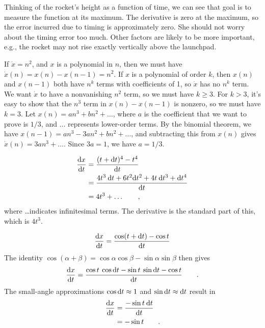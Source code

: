 
Thinking of the rocket's height as a function of time, we can see that goal is to measure
the function at its maximum. The derivative is zero at the maximum, so the error incurred
due to timing is approximately zero. She should not worry about the timing error too much.
Other factors are likely to be more important, e.g., the rocket may not rise exactly
vertically above the launchpad.

If $\dot{x}=n^2$, and $x$ is a polynomial in $n$, then we must have
$\dot{x}(n)=x(n)-x(n-1)=n^2$. If $x$ is a polynomial of order $k$, then
$x(n)$ and $x(n-1)$ both have $n^k$ terms with coefficients of 1, so 
$\dot{x}$ has no $n^k$ term. We want $\dot{x}$ to have a nonvanishing $n^2$ term,
so we must have $k\ge 3$. For $k>3$, it's easy to show that the $n^3$ term in
$x(n)-x(n-1)$ is nonzero, so we must have $k=3$. Let $x(n)=an^3+bn^2+\ldots$, where
$a$ is the coefficient that we want to prove is $1/3$, and $\ldots$ represents
lower-order terms. By the binomial theorem, we have $x(n-1)=an^3-3an^2+bn^2+\ldots$,
and subtracting this from $x(n)$ gives $\dot{x}(n)=3an^3+\ldots$. Since $3a=1$,
we have $a=1/3$.



\begin{align*}
  \frac{\textup{d} x}{\textup{d} t} &= \frac{(t+\textup{d} t)^4-t^4}{\textup{d} t} \\
                        &= \frac{4t^3\:\textup{d} t + 6t^2\textup{d} t^2 + 4t\:\textup{d} t^3+\textup{d} t^4}{\textup{d} t} \\
                        &= 4t^3 + \ldots \qquad ,
\end{align*}
where \ldots indicates infinitesimal terms.
The derivative is the standard part of this, which is $4t^3$.


\begin{equation*}
  \frac{\textup{d} x}{\textup{d} t} = \frac{\cos(t+\textup{d} t)-\cos t}{\textup{d} t}
\end{equation*}
The identity $\cos(\alpha+\beta)=\cos\alpha\cos\beta-\sin\alpha\sin\beta$ then gives
\begin{equation*}
  \frac{\textup{d} x}{\textup{d} t} = \frac{\cos t \: \cos \textup{d} t - \sin t \: \sin \textup{d} t - \cos t}{\textup{d} t} \qquad .\\
\end{equation*}
The small-angle approximations  $\cos \textup{d} t\approx 1$ and $\sin \textup{d} t\approx \textup{d} t$
result in
\begin{align*}
\frac{\textup{d} x}{\textup{d} t}   &= \frac{-\sin t \: \textup{d} t}{\textup{d} t} \\
                        &= -\sin t \qquad .
\end{align*}

